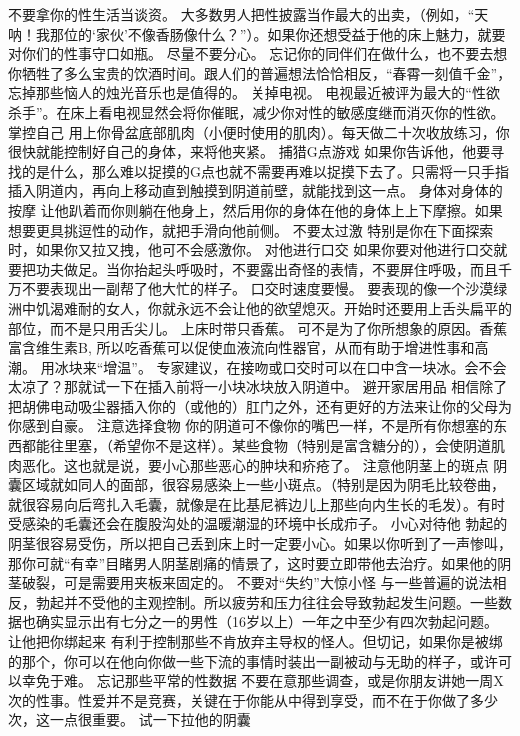 \documentclass[12pt,UTF8]{ctexbook}
\begin{document}
不要拿你的性生活当谈资。
大多数男人把性披露当作最大的出卖，（例如，“天呐！我那位的‘家伙’不像香肠像什么？”）。如果你还想受益于他的床上魅力，就要对你们的性事守口如瓶。
尽量不要分心。
忘记你的同伴们在做什么，也不要去想你牺牲了多么宝贵的饮酒时间。跟人们的普遍想法恰恰相反，“春霄一刻值千金”，忘掉那些恼人的烛光音乐也是值得的。
关掉电视。
电视最近被评为最大的“性欲杀手”。在床上看电视显然会将你催眠，减少你对性的敏感度继而消灭你的性欲。
掌控自己
用上你骨盆底部肌肉（小便时使用的肌肉）。每天做二十次收放练习，你很快就能控制好自己的身体，来将他夹紧。
捕猎G点游戏
如果你告诉他，他要寻找的是什么，那么难以捉摸的G点也就不需要再难以捉摸下去了。只需将一只手指插入阴道内，再向上移动直到触摸到阴道前壁，就能找到这一点。
身体对身体的按摩
让他趴着而你则躺在他身上，然后用你的身体在他的身体上上下摩擦。如果想要更具挑逗性的动作，就把手滑向他前侧。
不要太过激
特别是你在下面探索时，如果你又拉又拽，他可不会感激你。
对他进行口交
如果你要对他进行口交就要把功夫做足。当你抬起头呼吸时，不要露出奇怪的表情，不要屏住呼吸，而且千万不要表现出一副帮了他大忙的样子。
口交时速度要慢。
要表现的像一个沙漠绿洲中饥渴难耐的女人，你就永远不会让他的欲望熄灭。开始时还要用上舌头扁平的部位，而不是只用舌尖儿。
上床时带只香蕉。
可不是为了你所想象的原因。香蕉富含维生素B, 所以吃香蕉可以促使血液流向性器官，从而有助于增进性事和高潮。
用冰块来“增温”。
专家建议，在接吻或口交时可以在口中含一块冰。会不会太凉了？那就试一下在插入前将一小块冰块放入阴道中。
避开家居用品
相信除了把胡佛电动吸尘器插入你的（或他的）肛门之外，还有更好的方法来让你的父母为你感到自豪。
注意选择食物
你的阴道可不像你的嘴巴一样，不是所有你想塞的东西都能往里塞，（希望你不是这样）。某些食物（特别是富含糖分的），会使阴道肌肉恶化。这也就是说，要小心那些恶心的肿块和疥疮了。
注意他阴茎上的斑点
阴囊区域就如同人的面部，很容易感染上一些小斑点。（特别是因为阴毛比较卷曲，就很容易向后弯扎入毛囊，就像是在比基尼裤边儿上那些向内生长的毛发）。有时受感染的毛囊还会在腹股沟处的温暖潮湿的环境中长成疖子。
小心对待他
勃起的阴茎很容易受伤，所以把自己丢到床上时一定要小心。如果以你听到了一声惨叫，那你可就“有幸”目睹男人阴茎剧痛的情景了，这时要立即带他去治疗。如果他的阴茎破裂，可是需要用夹板来固定的。
不要对“失约”大惊小怪
与一些普遍的说法相反，勃起并不受他的主观控制。所以疲劳和压力往往会导致勃起发生问题。一些数据也确实显示出有七分之一的男性（16岁以上）一年之中至少有四次勃起问题。
让他把你绑起来
有利于控制那些不肯放弃主导权的怪人。但切记，如果你是被绑的那个，你可以在他向你做一些下流的事情时装出一副被动与无助的样子，或许可以幸免于难。
忘记那些平常的性数据
不要在意那些调查，或是你朋友讲她一周X次的性事。性爱并不是竞赛，关键在于你能从中得到享受，而不在于你做了多少次，这一点很重要。
试一下拉他的阴囊
\end{document}
